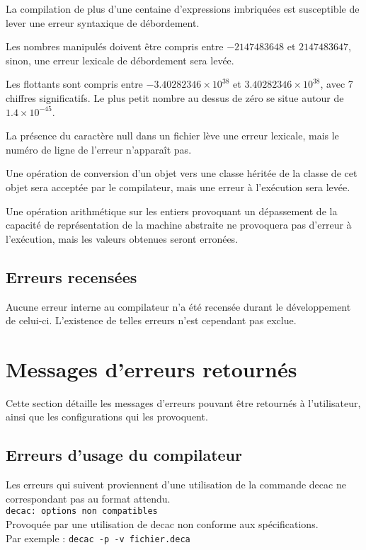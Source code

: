 \documentclass[12pt]{article}
\begin{document}
La compilation de plus d'une centaine d'expressions imbriquées est susceptible
de lever une erreur syntaxique de débordement.

Les nombres manipulés doivent être compris entre $-2147483648$ et $2147483647$, sinon,
une erreur lexicale de débordement sera levée.

Les flottants sont compris entre $-3.40282346 \times 10^{38}$ et $3.40282346
\times 10^{38}$, avec 7 chiffres significatifs.
Le plus petit nombre au dessus de zéro se situe autour de $1.4 \times 10^{-45}$.

La présence du caractère null dans un fichier lève une erreur lexicale, mais
le numéro de ligne de l'erreur n'apparaît pas.

Une opération de conversion d'un objet vers une classe héritée de la classe de cet objet sera acceptée par le compilateur,
mais une erreur à l'exécution sera levée.

Une opération arithmétique sur les entiers provoquant un dépassement de la capacité de représentation de la machine abstraite
ne provoquera pas d'erreur à l'exécution, mais les valeurs obtenues seront erronées.
\subsection{Erreurs recensées}

Aucune erreur interne au compilateur n'a été recensée durant le développement de celui-ci. L'existence de telles erreurs 
n'est cependant pas exclue.

\section{Messages d'erreurs retournés}

Cette section détaille les messages d'erreurs pouvant être retournés à 
l'utilisateur, ainsi que les configurations qui les provoquent.
\subsection{Erreurs d'usage du compilateur}
Les erreurs qui suivent proviennent d'une utilisation de la commande decac ne correspondant pas au format attendu.\\
\lstinline!decac: options non compatibles!\\
Provoquée par une utilisation de decac non conforme aux spécifications.\\
Par exemple : \lstinline!decac -p -v fichier.deca!\\
\end{document}
